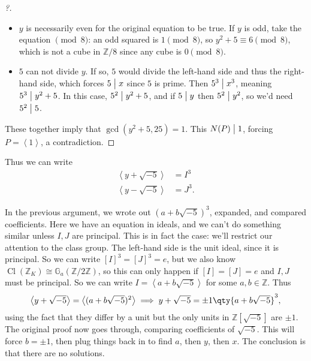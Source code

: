 \begin{example}
\begin{proof}[?]
\begin{itemize}
\item
  \(y\) is necessarily even for the original equation to be true. If
  \(y\) is odd, take the equation \(\pmod 8\): an odd squared is
  \(1\pmod 8\), so \(y^2 +5 \equiv 6 \pmod 8\), which is not a cube in
  \({\mathbb{Z}}/8\) since any cube is \(0\pmod 8\).
\item
  \(5\) can not divide \(y\). If so, \(5\) would divide the left-hand
  side and thus the right-hand side, which forces \(5\bigm|x\) since
  \(5\) is prime. Then \(5^3 \bigm|x^3\), meaning \(5^3 \bigm|y^2 + 5\).
  In this case, \(5^2 \bigm|y^2 + 5\), and if \(5\bigm|y\) then
  \(5^2 \bigm|y^2\), so we'd need \(5^2 \bigm|5\).
\end{itemize}

These together imply that \(\gcd(y^2 + 5, 25) = 1\). This
\(N(P) \bigm|1\), forcing \(P = \left\langle{ 1 }\right\rangle\), a
contradiction.

\end{proof}

Thus we can write
\begin{align*}
\left\langle{ y + \sqrt{-5} }\right\rangle  &= I^3 \\
\left\langle{ y - \sqrt{-5} }\right\rangle  &= J^3
.\end{align*}

In the previous argument, we wrote out \((a + b \sqrt{-5} )^3\),
expanded, and compared coefficients. Here we have an equation in ideals,
and we can't do something similar unless \(I, J\) are principal. This is
in fact the case: we'll restrict our attention to the class group. The
left-hand side is the unit ideal, since it is principal. So we can write
\([I]^3 = [J]^3 = e\), but we also know
\({ \operatorname{Cl}} ({\mathbb{Z}}_K) \cong {\mathbb{G}}_a({\mathbb{Z}}/2{\mathbb{Z}})\),
so this can only happen if \([I] = [J] = e\) and \(I, J\) must be
principal. So we can write
\(I = \left\langle{ a + b \sqrt{-5}}\right\rangle\) for some
\(a, b \in {\mathbb{Z}}\). Thus
\begin{align*}
\left\langle{ y + \sqrt{-5} }\right\rangle = \left\langle{ (a + b \sqrt{-5} )^2 }\right\rangle \implies y + \sqrt{-5} = \pm 1 \qty { a + b \sqrt{-5} }^3  
,\end{align*}
using the fact that they differ by a unit but the only units in
\({\mathbb{Z}}[ \sqrt{-5} ]\) are \(\pm 1\). The original proof now goes
through, comparing coefficients of \(\sqrt{-5}\). This will force
\(b = \pm 1\), then plug things back in to find \(a\), then \(y\), then
\(x\). The conclusion is that there are no solutions.

\end{example}

